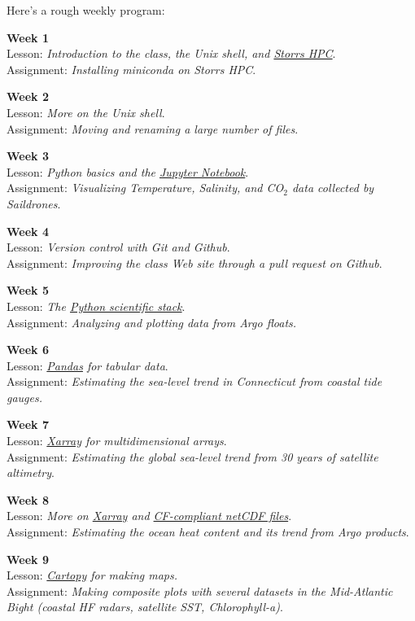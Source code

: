\documentclass[11pt]{article}
\begin{document}
Here's a rough weekly program:

\textbf{Week 1}\\
 Lesson: \textit{Introduction to the class, the Unix shell, and \href{https://hpc.uconn.edu/}{Storrs HPC}}.\\
 Assignment: \textit{Installing miniconda on Storrs HPC}.

\textbf{Week 2}\\
 Lesson: \textit{More on the Unix shell}.\\
 Assignment: \textit{Moving and renaming a large number of files}.

\textbf{Week 3} \\
Lesson: \textit{Python basics and the \href{https://jupyter.org/}{Jupyter Notebook}}.\\
Assignment:  \textit{Visualizing Temperature, Salinity, and CO$_2$  data collected by Saildrones}.

\textbf{Week 4}\\
 Lesson: \textit{Version control with Git and Github}.\\
 Assignment: \textit{Improving the class Web site through a pull request on Github}.
 
 \textbf{Week 5}\\
 Lesson: \textit{The \href{https://www.scipy.org/about.html}{Python scientific stack}}.\\
 Assignment: \textit{Analyzing and plotting data from Argo floats.}
 
\textbf{Week 6}\\
 Lesson: \textit{\href{https://pandas.pydata.org}{Pandas} for tabular data}.\\
 Assignment: \textit{Estimating the sea-level trend in Connecticut from coastal tide gauges.}

\textbf{Week 7}\\
 Lesson: \textit{\href{http://xarray.pydata.org/en/stable/}{Xarray} for multidimensional arrays}.\\
 Assignment: \textit{Estimating the global sea-level trend  from  30 years  of satellite altimetry}.

\textbf{Week 8}\\
 Lesson: \textit{More on \href{http://xarray.pydata.org/en/stable/}{Xarray} and \href{https://cfconventions.org}{CF-compliant netCDF files}}.\\
 Assignment: \textit{Estimating the ocean heat content and its trend from Argo products}.


\textbf{Week 9}\\
 Lesson: \textit{\href{https://scitools.org.uk/cartopy/docs/latest/}{Cartopy} for making maps.}\\
 Assignment: \textit{Making composite plots with several datasets in the Mid-Atlantic Bight (coastal HF radars, satellite SST, Chlorophyll-a)}.
\end{document}

